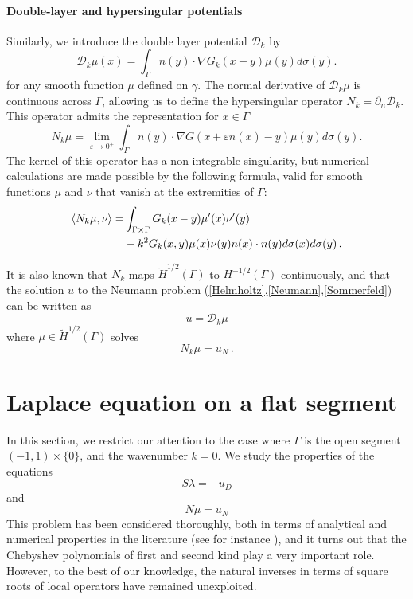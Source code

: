 \documentclass[a4paper]{article}
\begin{document}
\paragraph{Double-layer and hypersingular potentials}
Similarly, we introduce the double layer potential $\mathcal{D}_k$ by 
\[\mathcal{D}_k \mu(x) = \int_{\Gamma} n(y) \cdot \nabla G_k(x-y) \mu(y) d\sigma(y).\]
for any smooth function $\mu$ defined on $\gamma$.
The normal derivative of $\mathcal{D}_k\mu$ is continuous across $\Gamma$, allowing us to define the hypersingular operator $N_k = \partial_n \mathcal{D}_k$. This operator admits the representation for $x\in \Gamma$
\begin{equation}
	N_k \mu = \lim_{\varepsilon \to 0^+} \int_{\Gamma} n(y) \cdot \nabla G(x + \varepsilon n(x) - y) \mu(y) d\sigma(y).
	\label{defNk}
\end{equation}
The kernel of this operator has a non-integrable singularity, but numerical calculations are made possible by the following formula, valid for smooth functions $\mu$ and $\nu$ that vanish at the extremities of $\Gamma$: 
\begin{equation}
	\begin{split}
		\left\langle N_k \mu,\nu\right\rangle = &\int_{\Gamma\times \Gamma} G_k(x-y) \mu'(x) \nu'(y)\\
		&- k^2 G_k(x,y) \mu(x) \nu(y) n(x) \cdot n(y) d\sigma(x) d\sigma(y)\,.
	\end{split}
	\label{NkenfonctiondeSk}
\end{equation}

It is also known that $N_k$ maps $\tilde{H}^{1/2}(\Gamma)$ to $H^{-1/2}(\Gamma)$ continuously, and that the solution $u$ to the Neumann problem (\ref{Helmholtz},\ref{Neumann},\ref{Sommerfeld}) can be written as
\begin{equation}
	u = \mathcal{D}_k \mu
\end{equation}
where $\mu \in \tilde{H}^{1/2}(\Gamma)$ solves
\begin{equation}
	N_k \mu = u_N\,.
	\label{Nkmu}
\end{equation}  
	
\section{Laplace equation on a flat segment}

In this section, we restrict our attention to the case where $\Gamma$ is the open segment $(-1,1) \times \{0\}$, and the wavenumber $k=0$. We study the properties of the equations 
\[S\lambda = -u_D\]
and 
\[N\mu = u_N\]
This problem has been considered thoroughly, both
in terms of analytical and numerical properties in the literature (see for instance \cite{jiang2004second,bruno2012second}), and it turns out that the Chebyshev polynomials of first and second kind play a very important role. However, to the best of our knowledge, the natural inverses in terms of square roots of local operators have remained unexploited. 
\end{document}
